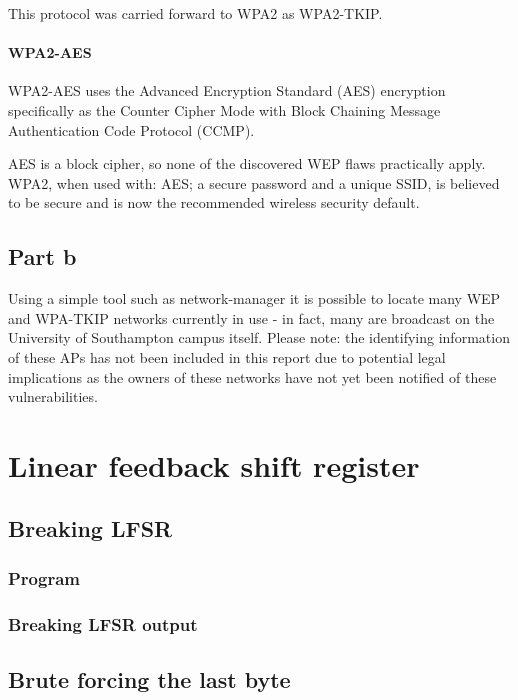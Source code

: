 \documentclass[pdftex, 11pt, a4paper]{article}
\begin{document}
This protocol was carried forward to WPA2 as WPA2-TKIP.

\paragraph{WPA2-AES}
WPA2-AES uses the Advanced Encryption Standard (AES) encryption specifically as the Counter Cipher Mode with Block Chaining Message Authentication Code Protocol (CCMP).

AES is a block cipher, so none of the discovered WEP flaws practically apply. WPA2, when used with: AES; a secure password and a unique SSID, is believed to be secure and is now the recommended wireless security default.

\subsection{Part b}
Using a simple tool such as network-manager\cite{nm} it is possible to locate many WEP and WPA-TKIP networks currently in use - in fact, many are broadcast on the University of Southampton campus itself.  Please note: the identifying information of these APs has not been included in this report due to potential legal implications as the owners of these networks have not yet been notified of these vulnerabilities.

\pagebreak
\printbibliography

\pagebreak
\appendices
\section{Linear feedback shift register}
\subsection{Breaking LFSR}
\subsubsection{Program}\label{break-lfsr}

\pagebreak

\subsubsection{Breaking LFSR output}\label{break-lfsr-out}
\pagebreak

\subsection{Brute forcing the last byte}
\end{document}
